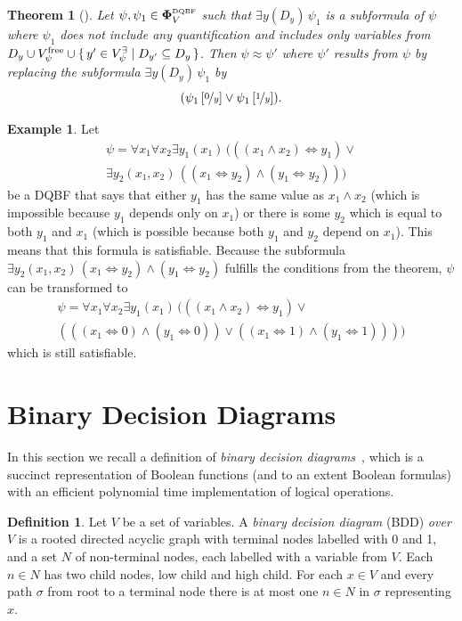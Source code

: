 \documentclass[
  digital, %
  color,
  twoside, %
  table,   %
  nolof,     %
  nolot,     %
]{fithesis3}
\let\setbuilder\set
\newcommand{\simpleset}[1]{\{{#1}\}}
\renewcommand{\set}[1]{\normalexpandarg\IfSubStr{#1}{|}{\setbuilder{#1}}{\simpleset{#1}}}
\newtheorem{theorem}{Theorem}[chapter] %
\theoremstyle{definition}
\newtheorem{definition}{Definition}
\newtheorem{example}{Example}
\theoremstyle{remark}
\newcommand{\substitute}[2]{\left[ \nicefrac{#2}{#1} \right]}
\newcommand{\DQBF}[1]{\mathbf{\Phi}_{#1}^{\normalfont{\text{\tiny DQBF}}}}
\newcommand{\evars}[1]{V_{#1}^{\exists}}
\newcommand{\fvars}[1]{V_{#1}^{\mathrm{free}}}
\newcommand{\lequal}{\Leftrightarrow}
\newcommand{\itholds}{\,}
\begin{document}
\begin{theorem}[{\cite[Theorem 5]{HQSquantifierLocalisation}}]
\label{thrm:exElim}
  Let $\psi, \psi_1 \in \DQBF{V}$ such that $\exists y(D_y)\itholds\psi_1$ is a subformula of $\psi$ where $\psi_1$ does not include any quantification and includes only variables from $D_y \cup \fvars{\psi} \cup \set{y' \in \evars{\psi} | D_{y'} \subseteq D_y}$. Then $\psi \approx \psi'$ where $\psi'$ results from $\psi$ by replacing the subformula $\exists y(D_y)\itholds\psi_1$ by
  \[(\psi_1\substitute{y}{0} \lor \psi_1\substitute{y}{1}).\]
\end{theorem}
\begin{example}
Let
\begin{multline*}
\psi = \forall x_1 \forall x_2 \exists y_1(x_1) \itholds (((x_1 \land x_2) \lequal y_1) \lor {} \\
\exists y_2 (x_1,x_2) \itholds ((x_1 \lequal y_2) \land (y_1 \lequal y_2)))
\end{multline*}
be a DQBF that says that either $y_1$ has the same value as $x_1 \land x_2$ (which is impossible because $y_1$ depends only on $x_1$) or there is some $y_2$ which is equal to both $y_1$ and $x_1$ (which is possible because both $y_1$ and $y_2$ depend on $x_1$). This means that this formula is satisfiable. Because the subformula $\exists y_2 (x_1,x_2) \itholds (x_1 \lequal y_2) \land (y_1 \lequal y_2)$ fulfills the conditions from the theorem, $\psi$ can be transformed to
\begin{multline*}
\psi = \forall x_1 \forall x_2 \exists y_1(x_1) \itholds (((x_1 \land x_2) \lequal y_1) \lor {}\\
(((x_1 \lequal 0) \land (y_1 \lequal 0)) \lor ((x_1 \lequal 1) \land (y_1 \lequal 1))))
\end{multline*}
which is still satisfiable.
\end{example}



\section{Binary Decision Diagrams}
\label{sec:BDD}
In this section we recall a definition of \emph{binary decision diagrams}~\cite{BDD}, which is a succinct representation of Boolean functions (and to an extent Boolean formulas) with an efficient polynomial time implementation of logical operations.

\begin{definition}
  Let $V$ be a set of variables. A \emph{binary decision diagram} (BDD) \emph{over $V$} is a rooted directed acyclic graph with terminal nodes labelled with 0 and 1, and a set $N$ of non-terminal nodes, each labelled with a variable from $V$. Each $n \in N$ has two child nodes, low child and high child. For each $x \in V$ and every path $\sigma$ from root to a terminal node there is at most one $n \in N$ in $\sigma$ representing $x$.
\end{definition}
\end{document}
